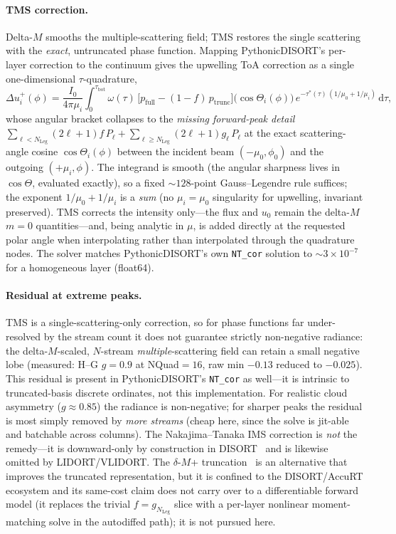 \documentclass[11pt,a4paper]{article}
\theoremstyle{definition}
\begin{document}
\paragraph{TMS correction.}
Delta-$M$ smooths the multiple-scattering field; TMS restores the single
scattering with the \emph{exact}, untruncated phase function.  Mapping
PythonicDISORT's per-layer correction to the continuum gives the upwelling ToA
correction as a single one-dimensional $\tau$-quadrature,
\begin{equation}
  \Delta u^{+}_i(\phi) = \frac{I_0}{4\pi\mu_i}\!\int_0^{\tau_{\mathrm{bot}}}\!
    \omega(\tau)\,\big[p_{\mathrm{full}} - (1-f)\,p_{\mathrm{trunc}}\big]
      \!\big(\cos\Theta_i(\phi)\big)\,
    e^{-\tau^\ast(\tau)\,(1/\mu_0 + 1/\mu_i)}\,\mathrm{d}\tau ,
  \label{eq:tms}
\end{equation}
whose angular bracket collapses to the \emph{missing forward-peak detail}
$\sum_{\ell<N_{\mathrm{Leg}}}(2\ell+1)f\,P_\ell
  + \sum_{\ell\ge N_{\mathrm{Leg}}}(2\ell+1)g_\ell\,P_\ell$
at the exact scattering-angle cosine $\cos\Theta_i(\phi)$ between the incident
beam $(-\mu_0,\phi_0)$ and the outgoing $(+\mu_i,\phi)$.  The integrand is smooth
(the angular sharpness lives in $\cos\Theta$, evaluated exactly), so a fixed
$\sim\!128$-point Gauss--Legendre rule suffices; the exponent $1/\mu_0+1/\mu_i$
is a \emph{sum} (no $\mu_i=\mu_0$ singularity for upwelling, invariant
preserved).  TMS corrects the intensity only---the flux and $u_0$ remain the
delta-$M$ $m=0$ quantities---and, being analytic in $\mu$, is added directly at
the requested polar angle when interpolating rather than interpolated through the
quadrature nodes.  The solver matches PythonicDISORT's own \texttt{NT\_cor}
solution to $\sim\!3\times10^{-7}$ for a homogeneous layer (float64).

\paragraph{Residual at extreme peaks.}
TMS is a single-scattering-only correction, so for phase functions far
under-resolved by the stream count it does not guarantee strictly non-negative
radiance: the delta-$M$-scaled, $N$-stream \emph{multiple}-scattering field can
retain a small negative lobe (measured: H--G $g=0.9$ at NQuad$=16$, raw min
$-0.13$ reduced to $-0.025$).  This residual is present in PythonicDISORT's
\texttt{NT\_cor} as well---it is intrinsic to truncated-basis discrete
ordinates, not this implementation.  For realistic cloud asymmetry
($g\!\approx\!0.85$) the radiance is non-negative; for sharper peaks the residual
is most simply removed by \emph{more streams} (cheap here, since the solve is
jit-able and batchable across columns).  The Nakajima--Tanaka IMS correction is
\emph{not} the remedy---it is downward-only by construction in
DISORT~\cite{STWLE2000} and is likewise omitted by LIDORT/VLIDORT.  The
$\delta$-$M$+ truncation~\cite{LinStamnes2018} is an alternative that improves the
truncated representation, but it is confined to the DISORT/AccuRT ecosystem and
its same-cost claim does not carry over to a differentiable forward model (it
replaces the trivial $f=g_{N_{\mathrm{Leg}}}$ slice with a per-layer nonlinear
moment-matching solve in the autodiffed path); it is not pursued here.
\end{document}
